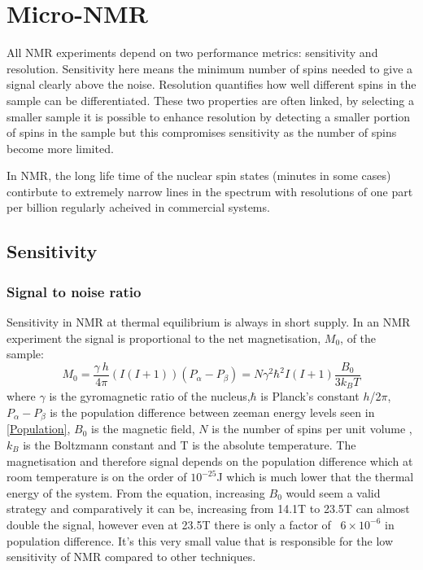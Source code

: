 \section{Micro-NMR}\label{Micro-NMR}

All NMR experiments depend on two performance metrics: sensitivity and resolution. Sensitivity
here means the minimum number of spins needed to give a signal clearly above the noise. Resolution
quantifies how well different spins in the sample can be differentiated. These two properties
are often linked, by selecting a smaller sample it is possible to enhance resolution by detecting
a smaller portion of spins in the sample but this compromises sensitivity as the number of spins become more
limited.

 In NMR, the long life time of the nuclear spin states (minutes in some cases) contirbute to extremely
 narrow lines in the spectrum with resolutions of one part per billion regularly acheived in
 commercial systems.

 \subsection{Sensitivity}

 \subsubsection{Signal to noise ratio}


 Sensitivity in NMR at thermal equilibrium is always in short supply. In an NMR experiment the signal
 is proportional to the net magnetisation, $M_0$, of the sample\citep{webb2005nmr}:
\begin{equation}\label{eqn:Webb}
  M_0 = \frac{\gamma~h}{4\pi}(I(I+1))(P_{\alpha}-P_{\beta}) = N\gamma^2\hbar^2I(I+1)\frac{B_0}{3k_BT}
\end{equation}
where $\gamma$ is the gyromagnetic ratio of the nucleus,$\hbar$ is Planck's constant $h$/2$\pi$, $P_{\alpha}-P_{\beta}$
is the population difference between zeeman energy levels seen in \ref{Population}, $B_0$ is the magnetic field, $N$ is
the number of spins per unit volume , $k_B$ is the Boltzmann constant and T is the absolute temperature. The magnetisation
and therefore signal depends on the population difference which at room temperature is on the order of $10^{-25}$J
which is much lower that the thermal energy of the system. From the equation, increasing $B_0$ would seem a
valid strategy and comparatively it can be, increasing from 14.1T to 23.5T can almost double the signal,
however even at 23.5T there is only a factor of ~$6\times10^{-6}$ in population difference. It's this
very small value that is responsible for the low sensitivity of NMR compared to other techniques.

